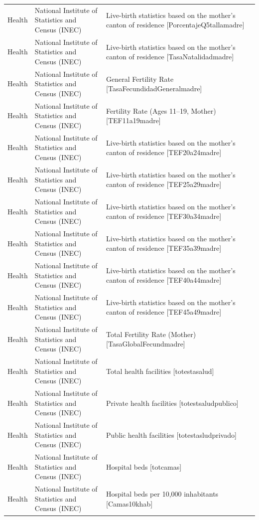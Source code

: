 \documentclass[10pt,a4paper]{article}
\begin{document}
\begin{longtable}{@{}>{\raggedright\arraybackslash}p{3.5cm}>{\raggedright\arraybackslash}p{5.6cm}>{\raggedright\arraybackslash}p{\dimexpr\textwidth-9.1cm-4\tabcolsep\relax}@{}}
Health & National Institute of Statistics and Census (INEC) & Live-birth statistics based on the mother's canton of residence [PorcentajeQ5tallamadre]\\
Health & National Institute of Statistics and Census (INEC) & Live-birth statistics based on the mother's canton of residence [TasaNatalidadmadre]\\
Health & National Institute of Statistics and Census (INEC) & General Fertility Rate [TasaFecundidadGeneralmadre]\\
Health & National Institute of Statistics and Census (INEC) & Fertility Rate (Ages 11--19, Mother) [TEF11a19madre]\\
Health & National Institute of Statistics and Census (INEC) & Live-birth statistics based on the mother's canton of residence [TEF20a24madre]\\
Health & National Institute of Statistics and Census (INEC) & Live-birth statistics based on the mother's canton of residence [TEF25a29madre]\\
Health & National Institute of Statistics and Census (INEC) & Live-birth statistics based on the mother's canton of residence [TEF30a34madre]\\
Health & National Institute of Statistics and Census (INEC) & Live-birth statistics based on the mother's canton of residence [TEF35a39madre]\\
Health & National Institute of Statistics and Census (INEC) & Live-birth statistics based on the mother's canton of residence [TEF40a44madre]\\
Health & National Institute of Statistics and Census (INEC) & Live-birth statistics based on the mother's canton of residence [TEF45a49madre]\\
Health & National Institute of Statistics and Census (INEC) & Total Fertility Rate (Mother) [TasaGlobalFecundmadre]\\
Health & National Institute of Statistics and Census (INEC) & Total health facilities [totestasalud]\\
Health & National Institute of Statistics and Census (INEC) & Private health facilities [totestsaludpublico]\\
Health & National Institute of Statistics and Census (INEC) & Public health facilities [totestasludprivado]\\
Health & National Institute of Statistics and Census (INEC) & Hospital beds [totcamas]\\
Health & National Institute of Statistics and Census (INEC) & Hospital beds per 10,000 inhabitants [Camas10khab]\\

\end{longtable}
\end{document}
